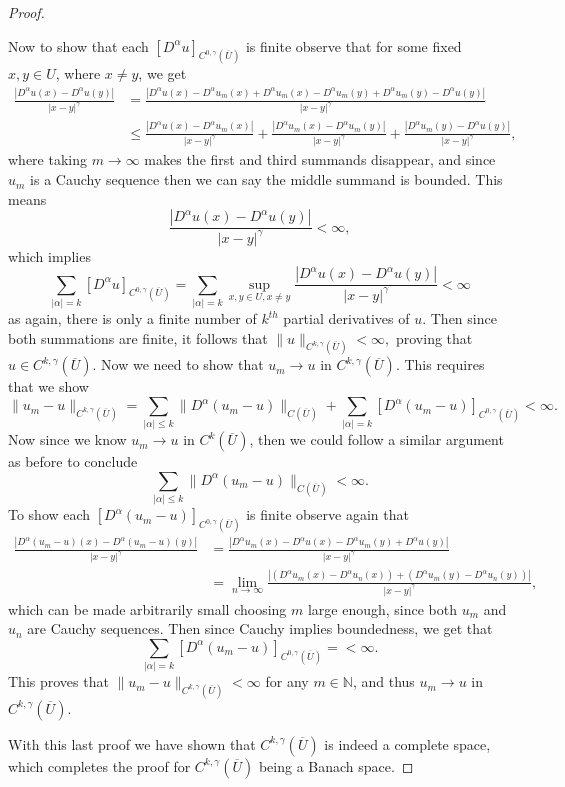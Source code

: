 \documentclass[11pt]{article}
\begin{document}
\begin{proof}
\begin{enumerate}[1.]
			Now to show that each $[D^{\alpha}u]_{C^{0,\gamma}(\overline{U})}$ is finite observe that for some fixed $x,y \in U$, where $x \not= y$, we get
			\begin{align*}
				\frac{|D^{\alpha}u(x) - D^{\alpha}u(y)|}{|x-y|^{\gamma}} &= \frac{|D^{\alpha}u(x) - D^{\alpha}u_m(x) + D^{\alpha}u_m(x) - D^{\alpha}u_m(y) + D^{\alpha}u_m(y) - D^{\alpha}u(y)|}{|x-y|^{\gamma}} \\
											 &\leq \frac{|D^{\alpha}u(x) - D^{\alpha}u_m(x)|}{|x-y|^{\gamma}} + \frac{|D^{\alpha}u_m(x) - D^{\alpha}u_m(y)|}{|x-y|^{\gamma}} + \frac{|D^{\alpha}u_m(y) - D^{\alpha}u(y)|}{|x-y|^{\gamma}},
			\end{align*}
			where taking $m \rightarrow \infty$ makes the first and third summands disappear, and since $u_m$ is a Cauchy sequence then we can say the middle summand is bounded. This means
			\[\frac{|D^{\alpha}u(x) - D^{\alpha}u(y)|}{|x-y|^{\gamma}} < \infty,\]
			which implies
			\[\sum_{|\alpha| = k}[D^{\alpha}u]_{C^{0,\gamma}(\overline{U})} = \sum_{|\alpha| = k}\sup_{x,y \in U, x \not= y}{\frac{|D^{\alpha}u(x) - D^{\alpha}u(y)|}{|x-y|^{\gamma}}} < \infty\]
			as again, there is only a finite number of $k^{th}$ partial derivatives of $u$. Then since both summations are finite, it follows that
			$\|u\|_{C^{k,\gamma}(\overline{U})} < \infty,$
			proving that $u \in C^{k,\gamma}(\overline{U})$. Now we need to show that $u_m \rightarrow u$ in $C^{k,\gamma}(\overline{U})$. This requires that we show
			\[\|u_m - u\|_{C^{k,\gamma}(\overline{U})} = \sum_{|\alpha| \leq k}\|D^{\alpha}(u_m - u)\|_{C(\overline{U})} + \sum_{|\alpha| = k}[D^{\alpha}(u_m - u)]_{C^{0,\gamma}(\overline{U})} < \infty.\]
			Now since we know $u_m \rightarrow u$ in $C^k(\overline{U})$, then we could follow a similar argument as before to conclude
			\[\sum_{|\alpha| \leq k}\|D^{\alpha}(u_m - u)\|_{C(\overline{U})} < \infty.\]
			To show each $[D^{\alpha}(u_m - u)]_{C^{0,\gamma}(\overline{U})}$ is finite observe again that
			\begin{align*}
				\frac{|D^{\alpha}(u_m - u)(x) - D^{\alpha}(u_m-u)(y)|}{|x-y|^{\gamma}} &= \frac{|D^{\alpha}u_m(x) - D^{\alpha}u(x) - D^{\alpha}u_m(y) + D^{\alpha}u(y)|}{|x-y|^{\gamma}} \\
                                                                                                       &= \lim_{n \rightarrow \infty} \frac{|(D^{\alpha}u_m(x) - D^{\alpha}u_n(x)) +(D^{\alpha}u_m(y) - D^{\alpha}u_n(y))|}{|x-y|^{\gamma}},
			\end{align*}
			which can be made arbitrarily small choosing $m$ large enough, since both $u_m$ and $u_n$ are Cauchy sequences. Then since Cauchy implies boundedness, we get that
			\[\sum_{|\alpha| = k}[D^{\alpha}(u_m-u)]_{C^{0,\gamma}(\overline{U})} = < \infty.\]
			This proves that $\|u_m - u\|_{C^{k,\gamma}(\overline{U})} < \infty$ for any $m \in \mathbb{N}$, and thus $u_m \rightarrow u$ in $C^{k,\gamma}(\overline{U})$.
	\end{enumerate}
	With this last proof we have shown that $C^{k,\gamma}(\overline{U})$ is indeed a complete space, which completes the proof for $C^{k,\gamma}(\overline{U})$ being a Banach space.
\end{proof}
\end{document}
